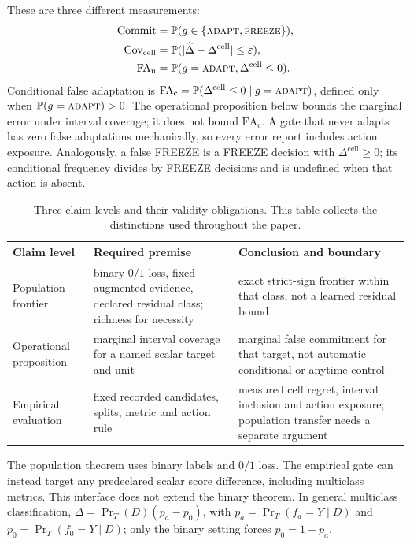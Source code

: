 These are three different measurements:
\begin{align}
  \mathrm{Commit}
    &=\mathbb{P}(g\in\{\textnormal{\textsc{adapt}},\textnormal{\textsc{freeze}}\}), \label{eq:commitment-rate}\\
  \mathrm{Cov}_{\mathrm{cell}}
    &=\mathbb{P}(|\widehat\Delta-\Delta^{\mathrm{cell}}|\le\varepsilon), \label{eq:interval-coverage}\\
  \mathrm{FA}_{\mathrm u}
    &=\mathbb{P}(g=\textnormal{\textsc{adapt}},\Delta^{\mathrm{cell}}\le0). \label{eq:compact-fau}
\end{align}
Conditional false adaptation is
$\mathrm{FA}_{\mathrm c}=\mathbb{P}(\Delta^{\mathrm{cell}}\le0\mid g=\textnormal{\textsc{adapt}})$, defined only when
$\mathbb{P}(g=\textnormal{\textsc{adapt}})>0$. The operational proposition below bounds the marginal error under interval
coverage; it does not bound $\mathrm{FA}_{\mathrm c}$. A gate that never adapts has zero false
adaptations mechanically, so every error report includes action exposure.
Analogously, a false FREEZE is a FREEZE decision with $\Delta^{\mathrm{cell}}\ge0$; its
conditional frequency divides by FREEZE decisions and is undefined when that action is absent.

\begin{table}[t]
\centering
\footnotesize
\caption{Three claim levels and their validity obligations. This table collects the distinctions
used throughout the paper.}
\label{tab:compact-validity}
\begin{tabular}{@{}p{}p{}p{}@{}}
\toprule
Claim level & Required premise & Conclusion and boundary \\
\midrule
Population frontier & binary $0/1$ loss, fixed augmented evidence, declared residual class; richness for necessity & exact strict-sign frontier within that class, not a learned residual bound \\
Operational proposition & marginal interval coverage for a named scalar target and unit & marginal false commitment for that target, not automatic conditional or anytime control \\
Empirical evaluation & fixed recorded candidates, splits, metric and action rule & measured cell regret, interval inclusion and action exposure; population transfer needs a separate argument \\
\bottomrule
\end{tabular}
\end{table}

The population theorem uses binary labels and $0/1$ loss. The empirical gate can instead target
any predeclared scalar score difference, including multiclass metrics. This interface does not
extend the binary theorem. In general multiclass classification,
$\Delta=\Pr_T(D)(p_a-p_0)$, with $p_a=\Pr_T(f_a=Y\mid D)$ and
$p_0=\Pr_T(f_0=Y\mid D)$; only the binary setting forces $p_0=1-p_a$.

